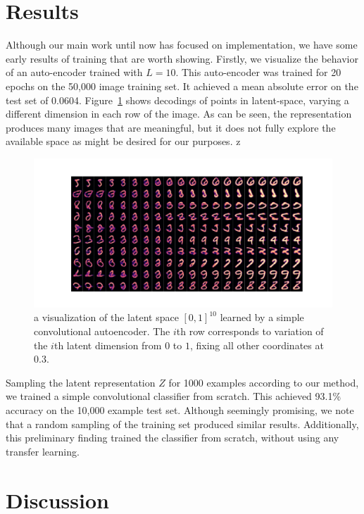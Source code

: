 \documentclass[a4paper]{article}
\begin{document}
\section{Results}
\label{sec:results}

Although our main work until now has focused on implementation, we have some
early results of training that are worth showing. Firstly, we visualize the
behavior of an auto-encoder trained with $L = 10$. This auto-encoder was trained
for 20 epochs on the 50,000 image training set. It achieved a mean absolute
error on the test set of 0.0604. Figure~\ref{fig:autoencoder-visualization}
shows decodings of points in latent-space, varying a different dimension in each
row of the image. As can be seen, the representation produces many images that
are meaningful, but it does not fully explore the available space as might be
desired for our purposes.
z
\begin{figure}
  \centering
  \includegraphics[width=\linewidth]{visualize_decoding}
  \caption{a visualization of the latent space $[0,1]^{10}$ learned by a simple
    convolutional autoencoder. The $i$th row corresponds to variation of the
    $i$th latent dimension from $0$ to $1$, fixing all other coordinates at
    $0.3$.}
  \label{fig:autoencoder-visualization}
\end{figure}

Sampling the latent representation $Z$ for 1000 examples according to our
method, we trained a simple convolutional classifier from scratch. This achieved
93.1\% accuracy on the 10,000 example test set. Although seemingly promising, we
note that a random sampling of the training set produced similar
results. Additionally, this preliminary finding trained the classifier from
scratch, without using any transfer learning.

\section{Discussion}
\label{sec:discussion}
\end{document}
